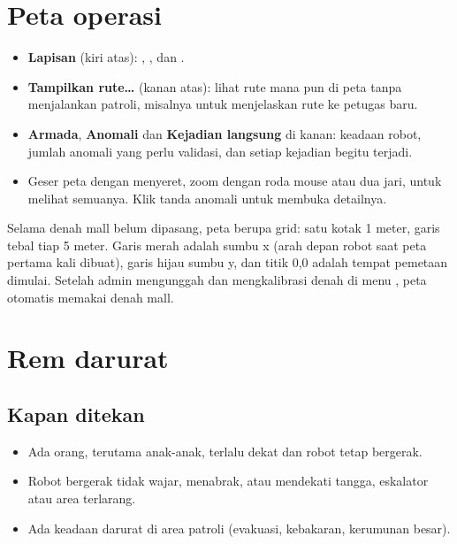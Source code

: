 \documentclass[11pt]{article}
\begin{document}
\clearpage
\section{Peta operasi}

\begin{itemize}
  \item \textbf{Lapisan} (kiri atas): , ,  dan .
  \item \textbf{Tampilkan rute\ldots} (kanan atas): lihat rute mana pun di peta tanpa menjalankan
        patroli, misalnya untuk menjelaskan rute ke petugas baru.
  \item \textbf{Armada}, \textbf{Anomali} dan \textbf{Kejadian langsung} di kanan: keadaan robot,
        jumlah anomali yang perlu validasi, dan setiap kejadian begitu terjadi.
  \item Geser peta dengan menyeret, zoom dengan roda mouse atau dua jari,  untuk melihat
        semuanya. Klik tanda anomali untuk membuka detailnya.
\end{itemize}

\begin{tips}
Selama denah mall belum dipasang, peta berupa grid: satu kotak 1 meter, garis tebal tiap 5 meter.
Garis merah adalah sumbu x (arah depan robot saat peta pertama kali dibuat), garis hijau sumbu y, dan
titik 0,0 adalah tempat pemetaan dimulai. Setelah admin mengunggah dan mengkalibrasi denah di menu
, peta otomatis memakai denah mall.
\end{tips}

\section{Rem darurat}
\label{sec:estop}

\subsection{Kapan ditekan}
\begin{itemize}
  \item Ada orang, terutama anak-anak, terlalu dekat dan robot tetap bergerak.
  \item Robot bergerak tidak wajar, menabrak, atau mendekati tangga, eskalator atau area terlarang.
  \item Ada keadaan darurat di area patroli (evakuasi, kebakaran, kerumunan besar).
\end{itemize}
\end{document}
